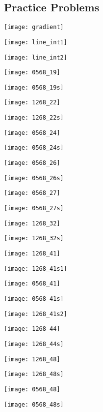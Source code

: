 \subsection{Practice Problems}

\texttt{[image: gradient]}

\texttt{[image: line\_int1]}

\texttt{[image: line\_int2]}

\texttt{[image: 0568\_19]}

\texttt{[image: 0568\_19s]}

\texttt{[image: 1268\_22]}

\texttt{[image: 1268\_22s]}

\texttt{[image: 0568\_24]}

\texttt{[image: 0568\_24s]}

\texttt{[image: 0568\_26]}

\texttt{[image: 0568\_26s]}

\texttt{[image: 0568\_27]}

\texttt{[image: 0568\_27s]}

\texttt{[image: 1268\_32]}

\texttt{[image: 1268\_32s]}

\texttt{[image: 1268\_41]}

\texttt{[image: 1268\_41s1]}

\texttt{[image: 0568\_41]}

\texttt{[image: 0568\_41s]}

\texttt{[image: 1268\_41s2]}

\texttt{[image: 1268\_44]}

\texttt{[image: 1268\_44s]}


\texttt{[image: 1268\_48]}

\texttt{[image: 1268\_48s]}

\texttt{[image: 0568\_48]}

\texttt{[image: 0568\_48s]}





%


%

% 
%
%
%
%
%
%